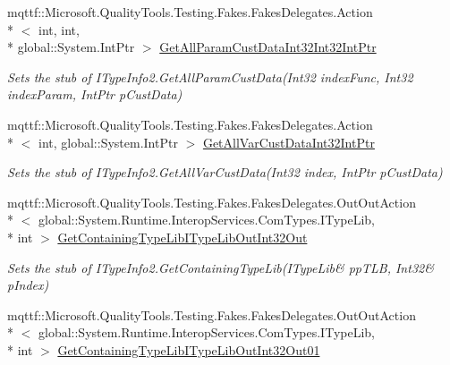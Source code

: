 \begin{DoxyCompactItemize}
mqttf\-::\-Microsoft.\-Quality\-Tools.\-Testing.\-Fakes.\-Fakes\-Delegates.\-Action\\*
$<$ int, int, \\*
global\-::\-System.\-Int\-Ptr $>$ \hyperlink{class_system_1_1_runtime_1_1_interop_services_1_1_com_types_1_1_fakes_1_1_stub_i_type_info2_aa746386964db4bf9f9cac0c931bf7544}{Get\-All\-Param\-Cust\-Data\-Int32\-Int32\-Int\-Ptr}
\begin{DoxyCompactList}\small\item\em Sets the stub of I\-Type\-Info2.\-Get\-All\-Param\-Cust\-Data(\-Int32 index\-Func, Int32 index\-Param, Int\-Ptr p\-Cust\-Data)\end{DoxyCompactList}\item 
mqttf\-::\-Microsoft.\-Quality\-Tools.\-Testing.\-Fakes.\-Fakes\-Delegates.\-Action\\*
$<$ int, global\-::\-System.\-Int\-Ptr $>$ \hyperlink{class_system_1_1_runtime_1_1_interop_services_1_1_com_types_1_1_fakes_1_1_stub_i_type_info2_a0189884bc741eb683a7a5d1e3831a754}{Get\-All\-Var\-Cust\-Data\-Int32\-Int\-Ptr}
\begin{DoxyCompactList}\small\item\em Sets the stub of I\-Type\-Info2.\-Get\-All\-Var\-Cust\-Data(\-Int32 index, Int\-Ptr p\-Cust\-Data)\end{DoxyCompactList}\item 
mqttf\-::\-Microsoft.\-Quality\-Tools.\-Testing.\-Fakes.\-Fakes\-Delegates.\-Out\-Out\-Action\\*
$<$ global\-::\-System.\-Runtime.\-Interop\-Services.\-Com\-Types.\-I\-Type\-Lib, \\*
int $>$ \hyperlink{class_system_1_1_runtime_1_1_interop_services_1_1_com_types_1_1_fakes_1_1_stub_i_type_info2_a23991adcb40eeae45bed7cef84335626}{Get\-Containing\-Type\-Lib\-I\-Type\-Lib\-Out\-Int32\-Out}
\begin{DoxyCompactList}\small\item\em Sets the stub of I\-Type\-Info2.\-Get\-Containing\-Type\-Lib(I\-Type\-Lib\& pp\-T\-L\-B, Int32\& p\-Index)\end{DoxyCompactList}\item 
mqttf\-::\-Microsoft.\-Quality\-Tools.\-Testing.\-Fakes.\-Fakes\-Delegates.\-Out\-Out\-Action\\*
$<$ global\-::\-System.\-Runtime.\-Interop\-Services.\-Com\-Types.\-I\-Type\-Lib, \\*
int $>$ \hyperlink{class_system_1_1_runtime_1_1_interop_services_1_1_com_types_1_1_fakes_1_1_stub_i_type_info2_a15a72f5585370e2b4340feaf26348102}{Get\-Containing\-Type\-Lib\-I\-Type\-Lib\-Out\-Int32\-Out01}

\end{DoxyCompactItemize}
